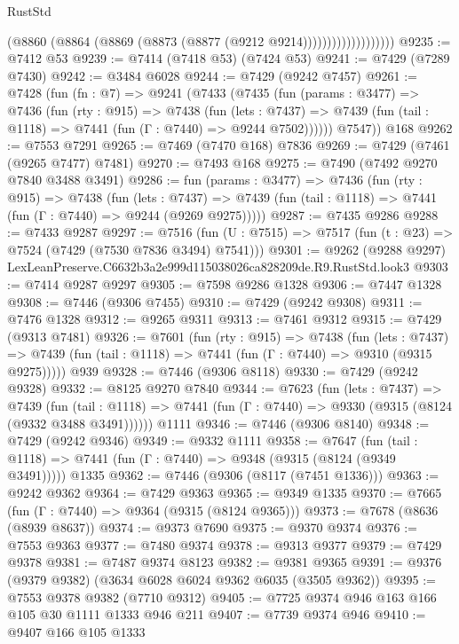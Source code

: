 \begin{lexlean}{RustStd}
\begin{coremodule}
                              (@8860 (@8864 (@8869 (@8873 (@8877 (@9212 @9214)))))))))))))))))))
@9235 := @7412 @53
@9239 := @7414 (@7418 @53) (@7424 @53)
@9241 := @7429 (@7289 @7430)
@9242 := @3484 @6028
@9244 := @7429 (@9242 @7457)
@9261 := @7428
    (fun (fn : @7) =>
    @9241
      (@7433
        (@7435
          (fun (params : @3477) =>
          @7436
            (fun (rty : @915) =>
            @7438
              (fun (lets : @7437) =>
              @7439 (fun (tail : @1118) => @7441 (fun (Γ : @7440) => @9244 @7502))))))
        @7547))
    @168
@9262 := @7553 @7291
@9265 := @7469 (@7470 @168) @7836
@9269 := @7429 (@7461 (@9265 @7477) @7481)
@9270 := @7493 @168
@9275 := @7490 (@7492 @9270 @7840 @3488 @3491)
@9286 := fun (params : @3477) =>
  @7436
    (fun (rty : @915) =>
    @7438
      (fun (lets : @7437) =>
      @7439 (fun (tail : @1118) => @7441 (fun (Γ : @7440) => @9244 (@9269 @9275)))))
@9287 := @7435 @9286
@9288 := @7433 @9287
@9297 := @7516 (fun (U : @7515) => @7517 (fun (t : @23) => @7524 (@7429 (@7530 @7836 @3494) @7541)))
@9301 := @9262 (@9288 @9297) LexLeanPreserve.C6632b3a2e999d115038026ca828209de.R9.RustStd.look3
@9303 := @7414 @9287 @9297
@9305 := @7598 @9286 @1328
@9306 := @7447 @1328
@9308 := @7446 (@9306 @7455)
@9310 := @7429 (@9242 @9308)
@9311 := @7476 @1328
@9312 := @9265 @9311
@9313 := @7461 @9312
@9315 := @7429 (@9313 @7481)
@9326 := @7601
    (fun (rty : @915) =>
    @7438
      (fun (lets : @7437) =>
      @7439 (fun (tail : @1118) => @7441 (fun (Γ : @7440) => @9310 (@9315 @9275)))))
    @939
@9328 := @7446 (@9306 @8118)
@9330 := @7429 (@9242 @9328)
@9332 := @8125 @9270 @7840
@9344 := @7623
    (fun (lets : @7437) =>
    @7439
      (fun (tail : @1118) => @7441 (fun (Γ : @7440) => @9330 (@9315 (@8124 (@9332 @3488 @3491))))))
    @1111
@9346 := @7446 (@9306 @8140)
@9348 := @7429 (@9242 @9346)
@9349 := @9332 @1111
@9358 := @7647
    (fun (tail : @1118) => @7441 (fun (Γ : @7440) => @9348 (@9315 (@8124 (@9349 @3491)))))
    @1335
@9362 := @7446 (@9306 (@8117 (@7451 @1336)))
@9363 := @9242 @9362
@9364 := @7429 @9363
@9365 := @9349 @1335
@9370 := @7665 (fun (Γ : @7440) => @9364 (@9315 (@8124 @9365)))
@9373 := @7678 (@8636 (@8939 @8637))
@9374 := @9373 @7690
@9375 := @9370 @9374
@9376 := @7553 @9363
@9377 := @7480 @9374
@9378 := @9313 @9377
@9379 := @7429 @9378
@9381 := @7487 @9374 @8123
@9382 := @9381 @9365
@9391 := @9376 (@9379 @9382) (@3634 @6028 @6024 @9362 @6035 (@3505 @9362))
@9395 := @7553 @9378 @9382 (@7710 @9312)
@9405 := @7725 @9374 @946 @163 @166 @105 @30 @1111 @1333 @946 @211
@9407 := @7739 @9374 @946
@9410 := @9407 @166 @105 @1333

\end{coremodule}
\end{lexlean}

